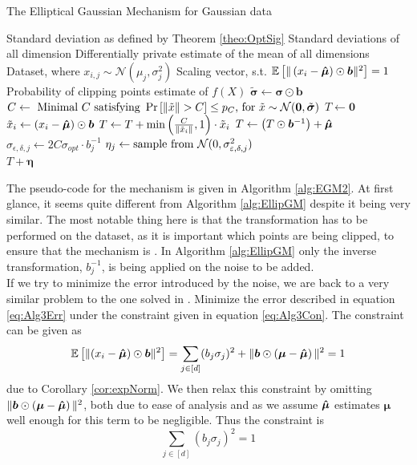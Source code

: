\documentclass[a4paper,12pt]{article}
\newcommand{\Desc}[2]{\State \makebox[6em][l]{#1}#2}
\begin{document}
\begin{algorithm}[h]
\caption{The Elliptical Gaussian Mechanism for Gaussian data}\label{alg:EGM2}
\begin{algorithmic}
    \Input
    \Desc{$\sigma_{opt} \in \R$}{Standard deviation as defined by Theorem \ref{theo:OptSig}}
    \Desc{$\bm{\sigma} \in \R^{d}$}{Standard deviations of all dimension}
    \Desc{$\bm{\hat{\mu}} \in \R^{d}$}{Differentially private estimate of the mean of all dimensions}
    \Desc{$X \in \R^{n \times d}$}{Dataset, where $x_{i,j} \sim \mathcal{N}(\mu_j,\sigma_j^2)$}
    \Desc{$\bm{b} \in \R^{d}$}{Scaling vector, s.t. $\ee{\lr{x_i - \bm{\hat{\mu}}} \odot \bm{b}} = 1$}
    \Desc{$p_C \in \R$}{Probability of clipping points}
    \EndInput
    \Output
    \State \edp estimate of $f(X)$
    \EndOutput
    \State $\tilde{\bm{\sigma}} \gets \bm{\sigma} \odot \bm{b}$
    \State $C \gets \textnormal{ Minimal $C$ satisfying } \prob{\|\tilde{x}\| > C} \le p_C \textnormal{, for } \tilde{x} \sim \mathcal{N}(\bm{0},\tilde{\bm{\sigma}})$
    \State $T \gets \bm{0}$
        \State $\tilde{x}_i \gets \lr{x_i - \bm{\hat{\mu}}} \odot \bm{b}$
        \State $T \gets T + \min \lr{\frac{C}{\|\tilde{x}_i\|}, 1} \cdot \tilde{x}_i $
    \EndFor
    \State $T \gets \lr{T \odot \bm{b}^{-1}} + \mue$
        \State $\sigma_{\epsilon, \delta, j} \gets 2C\sigma_{opt} \cdot b_j^{-1}$
        \State $\eta_j \gets \textnormal{sample from } \mathcal{N}(0, \sigma_{\epsilon, \delta, j}^2)$
    \EndFor \\
    \Return $T + \bm{\eta}$
\end{algorithmic}
\end{algorithm}
The pseudo-code for the mechanism is given in Algorithm \ref{alg:EGM2}. At first glance, it seems quite different from Algorithm \ref{alg:EllipGM}
despite it being very similar. The most notable thing here
is that the transformation has to be performed on the dataset,
as it is important which points are being clipped, to ensure that the mechanism is \edp.
In Algorithm \ref{alg:EllipGM} only the inverse transformation, $b_j^{-1}$, is being applied on the noise to be added. \\

\noindent If we try to minimize the error introduced by the noise, we are back to a very similar problem to the one solved in \cite{Lebeda2022}. 
Minimize the error described in equation \eqref{eq:Alg3Err}
under the constraint given in equation \eqref{eq:Alg3Con}.
The constraint can be given as
\begin{equation*}
    \ee{(x_i - \mue) \odot \bm{b}} = \sum_{j \in [d]} (b_j\sigma_j)^2 + \| \bm{b} \odot \lr{\bm{\mu} - \mue} \|^2 = 1
\end{equation*}
due to Corollary \ref{cor:expNorm}. We then relax this constraint by omitting $ \| \bm{b} \odot \lr{ \bm{\mu} - \mue} \|^2$, 
both due to ease of analysis and as we assume $\mue$ estimates $\bm{\mu}$ well enough for this term to be negligible.
Thus the constraint is
\begin{equation}
\label{eq:normcon}
\sum_{j \in [d]} (b_j\sigma_j)^2 = 1
\end{equation}
\end{document}
